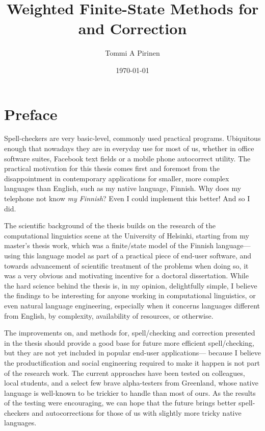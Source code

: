 \documentclass[officiallayout]{unihelcompling}
\title{Weighted Finite-State Methods for 
\misspelt{
Spell-Checking
}
and Correction
}
\author{Tommi A Pirinen}
\date{\today}
\begin{document}
\frontmatter

\maketitle

\begin{abstract} 
    
\end{abstract}

\mainmatter

\chapter*{Preface}
\label{chap:preface}

Spell-checkers are very basic-level, commonly used practical programs.
Ubi\-quitous enough that nowadays they are in everyday use for most of us,
whether in office software suites, Facebook text fields or a mobile phone
autocorrect utility. The practical motivation for this thesis comes first and
foremost from the disappointment in contemporary applications for smaller, more
complex languages than English, such as my native language, Finnish.  Why does
my telephone not know \emph{my Finnish}? Even I could implement this better!
And so I did.

The scientific background of the thesis builds on the research of the
computational linguistics scene at the University of Helsinki, starting from my
master's thesis work, which was a finite\-/state model of the Finnish
language---using this language model as part of a practical piece of end-user
software, and towards advancement of scientific treatment of the problems
when doing so, it was a very obvious and motivating incentive for a doctoral
dissertation. While the hard science behind the thesis is, in my opinion,
delightfully simple, I believe the findings to be interesting for anyone
working in computational linguistics, or even natural language engineering,
especially when it concerns languages different from English, by complexity,
availability of resources, or otherwise.

The improvements on, and methods for, spell\-/checking and correction
presented in the thesis should provide a good base for future more efficient
spell\-/checking, but they are not yet included in popular end-user
applications--- because I believe the productification and social engineering
required to make it happen is not part of the research work. The current
approaches have been tested on colleagues, local students, and a select few
brave alpha-testers from Greenland, whose native language is well-known to be
trickier to handle than most of ours. As the results of the testing were
encouraging, we can hope that the future brings better spell-checkers and
autocorrections for those of us with slightly more tricky native languages.
\end{document}
